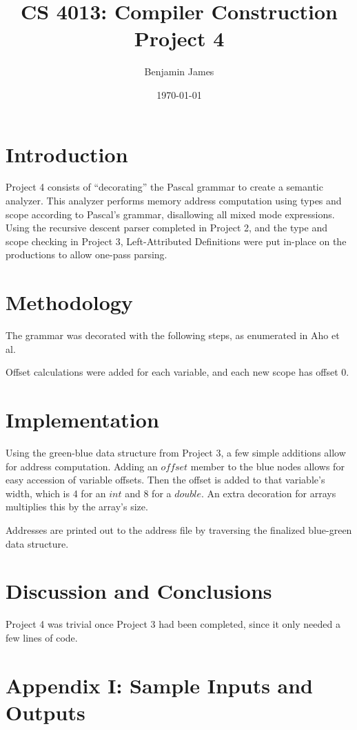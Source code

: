 \documentclass[titlepage]{article}
\author{Benjamin James}
\title{\textbf{CS 4013:  Compiler Construction \\ Project 4}}
\date{\today}
\begin{document}
\maketitle

\section*{Introduction}
Project 4 consists of ``decorating'' the Pascal grammar to create
a semantic analyzer. This analyzer performs memory address computation using
types and scope according to Pascal's grammar, disallowing all mixed mode expressions.  Using the recursive descent parser completed in Project 2, and the type and scope checking in Project 3, Left-Attributed Definitions were put in-place on the productions to allow one-pass parsing.

\section*{Methodology}
The grammar was decorated with the following steps, as enumerated in Aho et al.\cite{Aho86}

Offset calculations were added for each variable, and each new scope has offset 0.



\section*{Implementation}

Using the green-blue data structure from Project 3, a few simple additions allow for address computation.
Adding an $offset$ member to the blue nodes allows for easy accession of variable offsets. Then the offset is
added to that variable's width, which is 4 for an $int$ and 8 for a $double$. An extra decoration for arrays
multiplies this by the array's size.

Addresses are printed out to the address file by traversing the finalized blue-green data structure.

\section*{Discussion and Conclusions}
Project 4 was trivial once Project 3 had been completed, since it only needed a few lines of code.



\clearpage{}
\section*{Appendix I: Sample Inputs and Outputs}
\lstset{language=Pascal}
\end{document}
